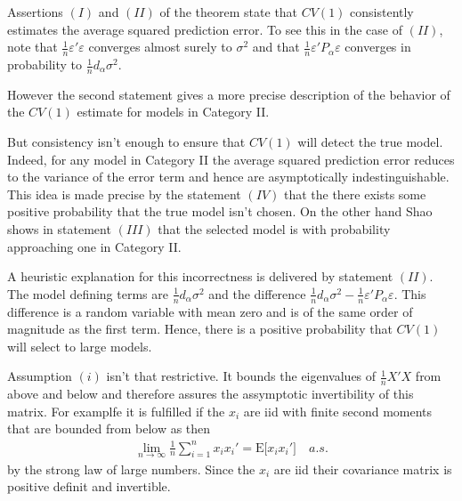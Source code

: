 \documentclass[Research_Module_ES.tex]{subfiles}
\begin{document}
Assertions $(I)$ and $(II)$ of the theorem state that $CV(1)$ consistently estimates the average squared prediction error. To see this in the case of $(II)$, note that $\frac{1}{n}\varepsilon'\varepsilon$ converges almost surely to $\sigma^2$ and that 
$\frac{1}{n}\varepsilon'P_\alpha\varepsilon$ converges in probability to $\frac{1}{n}d_\alpha\sigma^2$.\

However the second statement gives a more precise description of the behavior of the $CV(1)$ estimate for models in Category II. \

But consistency isn't enough to ensure that $CV(1)$ will detect the true model. Indeed, for any model in Category II the average squared prediction error reduces to the variance of the error term and hence are asymptotically indestinguishable. This idea is made precise by the statement $(IV)$ that the there exists some positive probability that the true model isn't chosen. On the other hand Shao shows in statement $(III)$ that the selected model is with probability approaching one in Category II.\

A heuristic explanation for this incorrectness is delivered by statement $(II)$. The model defining terms are $\frac{1}{n}d_\alpha\sigma^2$ and the difference $\frac{1}{n}d_\alpha\sigma^2 - \frac{1}{n}\varepsilon'P_\alpha\varepsilon$. This difference  is a random variable with mean zero and is of the same order of magnitude as the first term.
Hence, there is a positive probability that $CV(1)$ will select to large models. 

Assumption $(i)$ isn't that restrictive. It bounds the eigenvalues of $\frac{1}{n}X'X$ from above and below and therefore assures the assymptotic invertibility of this matrix. 
For examplfe it is fulfilled if the $x_i$ are iid with finite second moments that are bounded from below as then 
\begin{align*}
\lim_{n\to \infty} \frac{1}{n} \sum_{i=1}^n x_ix_i' = \mathrm{E}\bigl[ x_ix_i' \bigr] \quad a.s.
\end{align*} 
by the strong law of large numbers. Since the $x_i$ are iid their covariance matrix is positive definit and invertible. 
\end{document}
